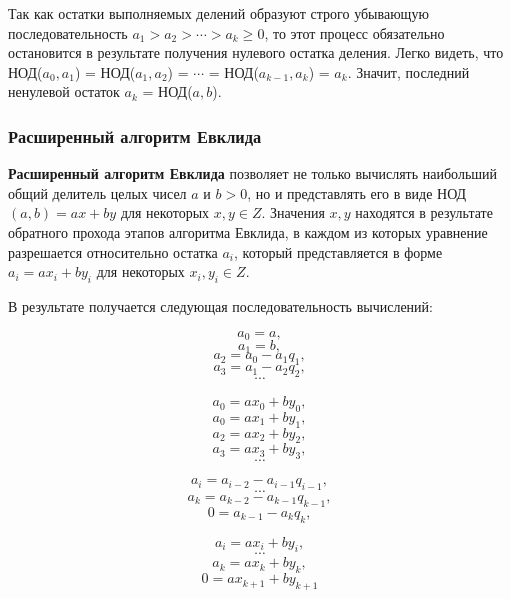 \documentclass[bachelor, och, labwork]{SCWorks}
\begin{document}
        Так как остатки выполняемых делений образуют строго убывающую
        последовательность $a_1 > a_2  > \cdots > a_k \geq 0$, то этот процесс
        обязательно остановится в результате получения нулевого остатка деления.
        Легко видеть, что НОД($a_0, a_1$) = НОД($a_1, a_2$) = $\cdots$ =
        НОД($a_{k-1}, a_k$) = $a_k$. Значит, последний ненулевой остаток $a_k$ =
        НОД($a,b$).

    \subsubsection{Расширенный алгоритм Евклида}

        \textbf{Расширенный алгоритм Евклида} позволяет не только вычислять
        наибольший общий делитель целых чисел $a$ и $b > 0$, но и представлять
        его в виде НОД$(a, b)= ax+by$ для некоторых $x, y \in Z$. Значения $x,y$
        находятся в результате обратного прохода этапов алгоритма Евклида, в
        каждом из которых уравнение разрешается относительно остатка $a_i$,
        который представляется в форме $a_i = ax_i + by_i$ для некоторых $x_i,
        y_i \in Z$. 
        
        В результате получается следующая последовательность
        вычислений:

        \begin{minipage}{0.4\textwidth}
            $$a_0 = a,$$
            $$a_1 = b,$$
            $$a_2 = a_0 - a_1q_1,$$
            $$a_3 = a_1 - a_2q_2,$$
            $$ \cdots $$
          \end{minipage}
          \hfill
        \begin{minipage}{0.4\textwidth}
            $$a_0 = ax_0 + by_0,$$
            $$a_0 = ax_1 + by_1,$$
            $$a_2 = ax_2 + by_2,$$
            $$a_3 = ax_3 + by_3,$$
            $$ \cdots $$
        \end{minipage}

        \begin{minipage}{0.4\textwidth}
            $$a_i = a_{i - 2} - a_{i - 1}q_{i - 1},$$
            $$ \cdots $$
            $$a_k = a_{k - 2} - a_{k - 1}q_{k - 1},$$
            $$0 = a_{k - 1} - a_k q_k,$$
        \end{minipage}
          \hfill
        \begin{minipage}{0.4\textwidth}
            $$a_i = ax_i + by_i,$$
            $$ \cdots $$
            $$a_k = ax_k + by_k,$$
            $$0 = ax_{k + 1} + by_{k + 1}$$
        \end{minipage}
\end{document}
